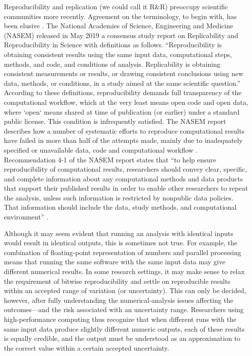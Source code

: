 Reproducibility and replication (we could call it R\&R) preoccupy scientific communities more recently. 
Agreement on the terminology, to begin with, has been elusive \cite{barba2018}. 
The National Academies of Science, Engineering and Medicine (NASEM) released in May 2019 a consensus study report on Replicability and Reproducibility in Science \cite{NASEM2019} with definitions as follows.
``Reproducibility is obtaining consistent results using the same input data, computational steps, methods, and code, and conditions of analysis.
Replicability is obtaining consistent measurements or results, or drawing consistent conclusions using new data, methods, or conditions, in a study aimed at the same scientific question.''
According to these definitions, reproducibility demands full transparency of the computational workflow, which at the very least means open code and open data, where `open` means shared at time of publication (or earlier) under a standard public license. 
This condition is infrequently satisfied.
The NASEM report describes how a number of systematic efforts to reproduce computational results have failed in more than half of the attempts made, mainly due to inadequately specified or unavailable data, code and computational workflow \cite{moraila-etal-2014,iqbal-etal-2016,chang-li2018,stodden-etal-2018}. 
Recommendation 4-1 of the NASEM report states that 
``to help ensure reproducibility of computational results, researchers should convey clear, specific, and complete information about any computational methods and data products that support their published results in order to enable other researchers to repeat the analysis, unless such information is restricted by nonpublic data policies. That information should include the data, study methods, and computational environment'' \cite{NASEM2019}.

Although it may seem evident that running an analysis with identical inputs would result in identical outputs, this is sometimes not true. 
For example, the combination of floating-point representation of numbers and parallel processing means that running the same software with the same input data may give different numerical results. 
In some research settings, it may make sense to relax the requirement of bitwise reproducibility and settle on reproducible results within an accepted range of variation (or uncertainty). 
This can only be decided, however, after fully understanding the numerical-analysis issues affecting the outcomes---and the risk associated with an uncertainty range. 
Researchers using high-performance computing thus recognize that when different runs with the same input data produce slightly different numeric outputs, each of these results is equally credible, and the output must be understood as an approximation to the correct value within a certain accepted uncertainty.


